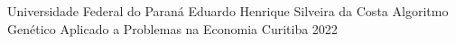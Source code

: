 





\captionsetup{figurename=FIGURA}
\captionsetup[table]{name=TABELA}




 
\renewcommand{\bibname}{Referências}
\renewcommand{\contentsname}{\centering \large \uppercase{Sumário}}
\renewcommand{\listfigurename}{\centering \large \uppercase{Lista de Figuras}}
\renewcommand{\listtablename}{\centering \large \uppercase{Lista de Tabelas}}
\renewcommand{\abstractname}{Resumo}
\renewcommand\appendixname{Apêndice}
\renewcommand\appendixpagename{Apêndices}
	

\capa
	{Universidade Federal do Paraná}
	{Eduardo Henrique Silveira da Costa}
	{Algoritmo Genético Aplicado a Problemas na Economia}
	{Curitiba}
	{2022}


